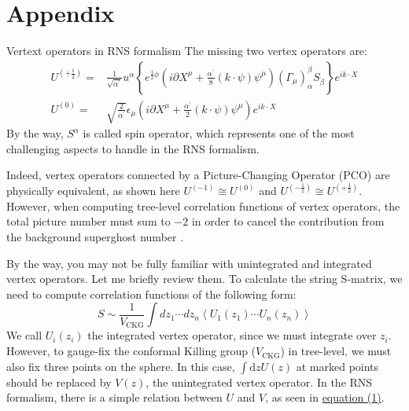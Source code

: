 \documentclass{beamer}
\begin{document}
\section[Appendix]{Appendix}
\begin{frame}[allowframebreaks]{Vertext operators in RNS formalism}\label{vertex ops}
	The missing two vertex operators are:
	\begin{equation*}
		\begin{aligned}
			U^{(+\frac{1}{2})}=&\frac{1}{\sqrt{\alpha^{\prime}}}u^{\alpha}\left\{e^{\frac{1}{2}\phi}(i\partial X^{\mu}+\frac{\alpha^{\prime}}{8}(k\cdot\psi)\psi^{\mu})(\Gamma_{\mu})_{\alpha}^{\dot{\beta}}S_{\dot{\beta}}\right\}e^{ik\cdot X}\\
			U^{(0)}=&\sqrt{\frac{2}{\alpha^{\prime}}}\epsilon_{\mu}\left(i\partial X^{\mu}+\frac{\alpha^{\prime}}{2}(k\cdot\psi)\psi^{\mu}\right)e^{ik\cdot X}
		\end{aligned}
	\end{equation*}
	By the way, $S^\alpha$ is called {\color{WHU} spin operator}, which represents one of the most challenging aspects to handle in the RNS formalism.
	
	Indeed, vertex operators connected by a Picture-Changing Operator (PCO) are physically equivalent, as shown here $U^{(-1)}\cong U^{(0)}$ and $U^{(-\frac12)}\cong U^{(+\frac12)}$. However, when computing tree-level correlation functions of vertex operators, the total picture number must sum to $-2$ in order to cancel the contribution from the background superghost number \cite{blumenhagen}.
	
	By the way, you may not be fully familiar with unintegrated and integrated vertex operators. Let me briefly review them. To calculate the string S-matrix, we need to compute correlation functions of the following form:
	\begin{equation*}
		S\sim \frac{1}{V_{\text{CKG}}}\int dz_1\cdots dz_n \left\langle U_1(z_1)\cdots U_n(z_n)\right\rangle
	\end{equation*}
	We call $U_i(z_i)$ the \textcolor{WHU}{integrated vertex operator}, since we must integrate over $z_i$. However, to gauge-fix the conformal Killing group ($V_{\text{CKG}}$) in tree-level, we must also fix three points on the sphere. In this case, $\int \mathrm{d}z U(z)$ at marked points should be replaced by $V(z)$, the \textcolor{WHU}{unintegrated vertex operator}. In the RNS formalism, there is a simple relation between $U$ and $V$, as seen in \hyperlink{eq:UV}{\color{blue}equation (1)}.
\end{frame}
\end{document}
